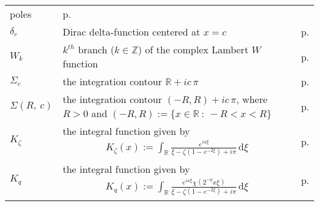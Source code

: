 \documentclass[../dissertation.tex]{subfiles}
\begin{document}
\begin{centering}
\begin{longtable}{R{.115\textwidth}|L{.74\textwidth}|C{.145\textwidth}}
				poles 
			& p.\pageref{sym1:ressum} \\
		$\delta_c$ & Dirac delta-function centered at $x=c$ 
			& p.\pageref{sym:dirac} \\
		$W_k$ & $k^{th}$ branch ($k \in \mathbb Z$) of the complex Lambert $W$ function
			& p.\pageref{sym1:Wk} \\
		$\Sigma_{c}$ & the integration contour
				$\mathbb R + i c \, \pi$
			& p.\pageref{sym1:SigRealLine} \\
		$\Sigma(R,~c)$ & the integration contour $(-R, R) + i c \,\pi$,
				where $R > 0$ and $(-R, R):= \{x \in \mathbb R ~:~ -R < x < R\}$
			& p.\pageref{sym1:SigR} \\
		$K_\zeta$ & the integral function given by 
				{
					\begin{align*}
						K_\zeta(x) 
							:= \int_{\mathbb R} 
								\frac{e^{ix \xi}}{\xi - \zeta\left(1-e^{-2\xi}\right)+i\pi}
							\, \mathrm{d}\xi
					\end{align*}
				}
			& p.\pageref{sym1:Kzeta} \\
		$K_q$ & the integral function given by 
				{
					\begin{align*}
						K_q(x) 
							:= \int_{\mathbb R} 
								\frac{e^{ix\xi} \chi\left( 2^{-q} x \xi\right)}
									{\xi - \zeta\left(1-e^{-2\xi}\right)+i\pi}
							\, \mathrm{d}\xi
					\end{align*}
				}
			& p.\pageref{sym1:Kq} \\
	\end{longtable}
\end{centering}



\newpage
\end{document}
